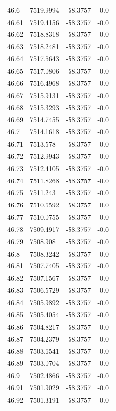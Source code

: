 \begin{table}[H]
\begin{tabular}{llll}
46.6 & 7519.9994 & -58.3757 & -0.0 \\
46.61 & 7519.4156 & -58.3757 & -0.0 \\
46.62 & 7518.8318 & -58.3757 & -0.0 \\
46.63 & 7518.2481 & -58.3757 & -0.0 \\
46.64 & 7517.6643 & -58.3757 & -0.0 \\
46.65 & 7517.0806 & -58.3757 & -0.0 \\
46.66 & 7516.4968 & -58.3757 & -0.0 \\
46.67 & 7515.9131 & -58.3757 & -0.0 \\
46.68 & 7515.3293 & -58.3757 & -0.0 \\
46.69 & 7514.7455 & -58.3757 & -0.0 \\
46.7 & 7514.1618 & -58.3757 & -0.0 \\
46.71 & 7513.578 & -58.3757 & -0.0 \\
46.72 & 7512.9943 & -58.3757 & -0.0 \\
46.73 & 7512.4105 & -58.3757 & -0.0 \\
46.74 & 7511.8268 & -58.3757 & -0.0 \\
46.75 & 7511.243 & -58.3757 & -0.0 \\
46.76 & 7510.6592 & -58.3757 & -0.0 \\
46.77 & 7510.0755 & -58.3757 & -0.0 \\
46.78 & 7509.4917 & -58.3757 & -0.0 \\
46.79 & 7508.908 & -58.3757 & -0.0 \\
46.8 & 7508.3242 & -58.3757 & -0.0 \\
46.81 & 7507.7405 & -58.3757 & -0.0 \\
46.82 & 7507.1567 & -58.3757 & -0.0 \\
46.83 & 7506.5729 & -58.3757 & -0.0 \\
46.84 & 7505.9892 & -58.3757 & -0.0 \\
46.85 & 7505.4054 & -58.3757 & -0.0 \\
46.86 & 7504.8217 & -58.3757 & -0.0 \\
46.87 & 7504.2379 & -58.3757 & -0.0 \\
46.88 & 7503.6541 & -58.3757 & -0.0 \\
46.89 & 7503.0704 & -58.3757 & -0.0 \\
46.9 & 7502.4866 & -58.3757 & -0.0 \\
46.91 & 7501.9029 & -58.3757 & -0.0 \\
46.92 & 7501.3191 & -58.3757 & -0.0 \\

\end{tabular}
\end{table}
